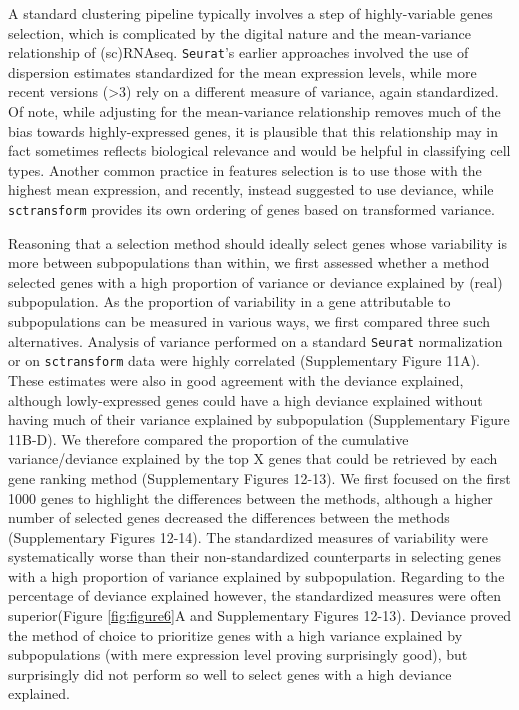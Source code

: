 \documentclass{bmcart}
\begin{document}
A standard clustering pipeline typically involves a step of highly-variable genes selection, which is complicated by the digital nature and the mean-variance relationship of (sc)RNAseq. \texttt{Seurat}'s earlier approaches involved the use of dispersion estimates standardized for the mean expression levels, while more recent versions (>3) rely on a different measure of variance, again standardized. Of note, while adjusting for the mean-variance relationship removes much of the bias towards highly-expressed genes, it is plausible that this relationship may in fact sometimes reflects biological relevance and would be helpful in classifying cell types. Another common practice in features selection is to use those with the highest mean expression, and recently, \citep{townesGlmpca2019} instead suggested to use deviance, while \texttt{sctransform} provides its own ordering of genes based on transformed variance.

Reasoning that a selection method should ideally select genes whose variability is more between subpopulations than within, we first assessed whether a method selected genes with a high proportion of variance or deviance explained by (real) subpopulation. As the proportion of variability in a gene attributable to subpopulations can be measured in various ways, we first compared three such alternatives. Analysis of variance performed on a standard \texttt{Seurat} normalization or on \texttt{sctransform} data were highly correlated (Supplementary Figure 11A). These estimates were also in good agreement with the deviance explained, although lowly-expressed genes could have a high deviance explained without having much of their variance explained by subpopulation (Supplementary Figure 11B-D). We therefore compared the proportion of the cumulative variance/deviance explained by the top X genes that could be retrieved by each gene ranking method (Supplementary Figures 12-13). We first focused on the first 1000 genes to highlight the differences between the methods, although a higher number of selected genes decreased the differences between the methods (Supplementary Figures 12-14). The standardized measures of variability were systematically worse than their non-standardized counterparts in selecting genes with a high proportion of variance explained by subpopulation. Regarding to the percentage of deviance explained however, the standardized measures were often superior(Figure \ref{fig:figure6}A and Supplementary Figures 12-13). Deviance proved the method of choice to prioritize genes with a high variance explained by subpopulations (with mere expression level proving surprisingly good), but surprisingly did not perform so well to select genes with a high deviance explained.
\end{document}
